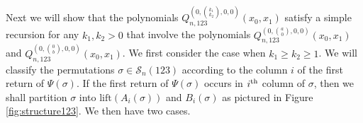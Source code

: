 \documentclass[
final,nomarks
]{dmtcs-episciences}
\newcommand{\fref}[1]{Figure \ref{fig:#1}}
\newcommand{\Sn}[1]{\mathcal{S}_{#1}}
\newcommand{\Qmzn}[3]{Q_{#3,123}^{(0,\binom{#1}{#2},0,0)}(x_0,x_1)}
\newcommand{\thn}[1]{\begin{math}#1^\textnormal{th}\end{math}}
\begin{document}
Next we will show that the polynomials \begin{math}\Qmzn{k_1}{k_2}{n}\end{math} satisfy a simple 
recursion for any \begin{math}k_1,k_2>0\end{math} that involve the polynomials 
\begin{math}\Qmzn{a}{0}{n}\end{math} and \begin{math}\Qmzn{0}{b}{n}\end{math}. We first consider the case when \begin{math}k_1\geq k_2 \geq 1\end{math}.   
We will classify the permutations \begin{math}\sigma\in\Sn{n}(123)\end{math} 
according to the column \begin{math}i\end{math} of the first return of \begin{math}\Psi(\sigma)\end{math}. If 
the first return of \begin{math}\Psi(\sigma)\end{math} occurs in \thn{i} column of \begin{math}\sigma\end{math}, then 
we shall partition \begin{math}\sigma\end{math} into \begin{math}\mathrm{lift}(A_i(\sigma))\end{math} and \begin{math}B_i(\sigma)\end{math} 
as pictured in \fref{structure123}. We then have two cases. 
\end{document}
